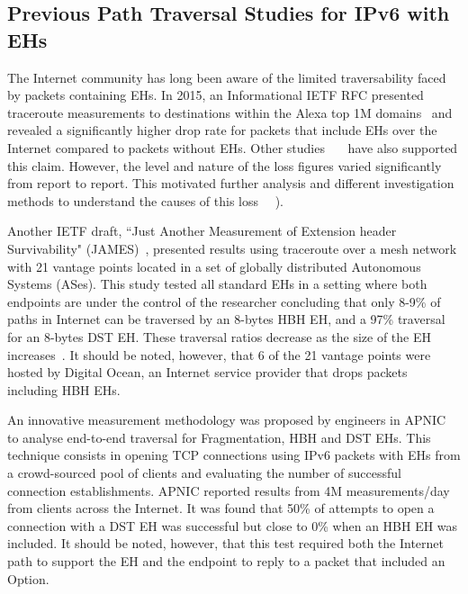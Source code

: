 \documentclass[conference]{IEEEtran}
\begin{document}
\subsection{Previous Path Traversal Studies for IPv6 with EHs}

\label{sec:motivation}

The Internet community has long been aware of the limited traversability faced
by packets containing EHs.  In 2015, an Informational IETF RFC presented
traceroute measurements to destinations within the Alexa top 1M
domains~\cite{RFC7872} and revealed a significantly higher drop rate for
packets that include EHs over the Internet compared to packets without EHs.
Other studies~\cite{james}~\cite{nalini-iepg114}~\cite{apnic} have also
supported this claim.  However, the level and nature of the loss figures varied
significantly from report to report. This motivated further analysis and
different investigation methods to understand the causes of this loss
~\cite{james}~\cite{elkins-v6ops-eh-deepdive-fw-01}).  

Another IETF draft, ``Just Another Measurement of Extension header
Survivability" (JAMES)~\cite{james}, presented results using traceroute over a
mesh network with 21 vantage points located in a set of globally distributed
Autonomous Systems (ASes). This study tested all standard EHs in a setting
where both endpoints are under the control of the researcher concluding that
only 8-9\% of paths in Internet can be traversed by an 8-bytes HBH EH, and a
97\% traversal for an 8-bytes DST EH.  These traversal ratios decrease as the
size of the EH increases~\cite{james-imc}. It should be noted, however, that 6
of the 21 vantage points were hosted by Digital Ocean\texttrademark, an
Internet service provider that drops packets including HBH EHs.

An innovative measurement methodology was proposed by engineers in
APNIC~\cite{apnic} to analyse end-to-end traversal for Fragmentation, HBH and
DST EHs.  This technique consists in opening TCP connections using IPv6 packets
with EHs from a crowd-sourced pool of clients and evaluating the number of
successful connection establishments.  APNIC reported results from 4M
measurements/day from clients across the Internet.  It was found that 50\%  of
attempts to open a connection with a DST EH was successful but close to 0\%
when an HBH EH was included.  It should be noted, however, that this test
required both the Internet path to support the EH and the endpoint to reply to
a packet that included an Option. 
\end{document}
